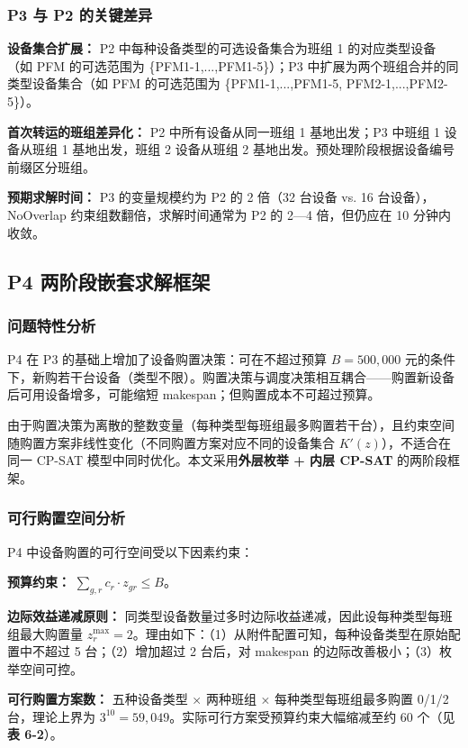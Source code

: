\documentclass[UTF8,a4paper,12pt]{ctexart}
\begin{document}
\subsubsection{P3 与 P2 的关键差异}
\textbf{设备集合扩展：} P2 中每种设备类型的可选设备集合为班组 1 的对应类型设备（如 PFM 的可选范围为 \{PFM1-1,...,PFM1-5\}）；P3 中扩展为两个班组合并的同类型设备集合（如 PFM 的可选范围为 \{PFM1-1,...,PFM1-5, PFM2-1,...,PFM2-5\}）。

\textbf{首次转运的班组差异化：} P2 中所有设备从同一班组 1 基地出发；P3 中班组 1 设备从班组 1 基地出发，班组 2 设备从班组 2 基地出发。预处理阶段根据设备编号前缀区分班组。

\textbf{预期求解时间：} P3 的变量规模约为 P2 的 2 倍（32 台设备 vs. 16 台设备），NoOverlap 约束组数翻倍，求解时间通常为 P2 的 2—4 倍，但仍应在 10 分钟内收敛。

\subsection{P4 两阶段嵌套求解框架}
\subsubsection{问题特性分析}
P4 在 P3 的基础上增加了设备购置决策：可在不超过预算 $B = 500{,}000$ 元的条件下，新购若干台设备（类型不限）。购置决策与调度决策相互耦合——购置新设备后可用设备增多，可能缩短 makespan；但购置成本不可超过预算。

由于购置决策为离散的整数变量（每种类型每班组最多购置若干台），且约束空间随购置方案非线性变化（不同购置方案对应不同的设备集合 $K'(z)$），不适合在同一 CP-SAT 模型中同时优化。本文采用\textbf{外层枚举 + 内层 CP-SAT} 的两阶段框架。

\subsubsection{可行购置空间分析}
P4 中设备购置的可行空间受以下因素约束：

\textbf{预算约束：} $\sum_{g,r} c_r \cdot z_{gr} \leq B$。

\textbf{边际效益递减原则：} 同类型设备数量过多时边际收益递减，因此设每种类型每班组最大购置量 $z_r^{\max} = 2$。理由如下：（1）从附件配置可知，每种设备类型在原始配置中不超过 5 台；（2）增加超过 2 台后，对 makespan 的边际改善极小；（3）枚举空间可控。

\textbf{可行购置方案数：} 五种设备类型 × 两种班组 × 每种类型每班组最多购置 0/1/2 台，理论上界为 $3^{10} = 59{,}049$。实际可行方案受预算约束大幅缩减至约 60 个（见\textbf{表 6-2}）。
\end{document}
